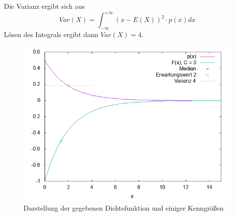 \documentclass[fleqn,a4paper,12pt]{article}
\begin{document}
  Die Varianz ergibt sich aus \[\textit{Var}(X) = \int_{-\infty}^{+\infty} ( x - E(X) )^2 \cdot p(x) dx\]
  Lösen des Integrals ergibt dann $\textit{Var}(X) = 4$.
  \begin{figure}
      \includegraphics[width=1.0\textwidth]{sv0_7.png}
      \caption{Darstellung der gegebenen Dichtefunktion und einiger Kenngrößen}
  \end{figure}
    
  
\end{document}
